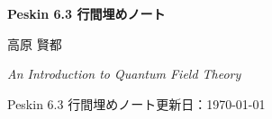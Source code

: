 \documentclass[uplatex,dvipdfmx,a4paper,11pt]{jsarticle}
\newcommand{\NotesTitle}{Peskin 6.3 行間埋めノート}
\newcommand{\NotesBookAuthor}{高原 賢都}
\newcommand{\NotesBookTitle}{An Introduction to Quantum Field Theory}
\newcommand{\NotesUpdated}{\today}
\begin{document}
\begin{center}
  \vspace*{3mm}
  {\LARGE\bfseries \NotesTitle\par}
  \vspace{4mm}
  {\large \NotesBookAuthor\par}
  \vspace{1.5mm}
  {\itshape \NotesBookTitle\par}
  \vspace{5mm}
  {\small Peskin 6.3 行間埋めノート\qquad 更新日：\NotesUpdated\par}
\end{center}

\vspace{5mm}
\hypertarget{toc}{}
\tableofcontents　
\clearpage

\end{document}
